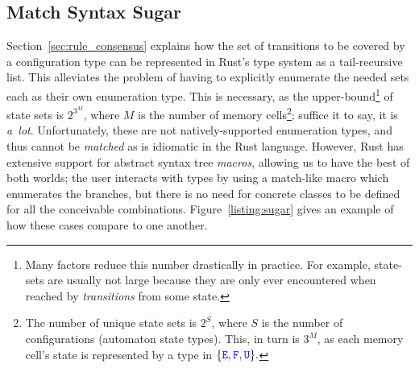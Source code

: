 %
%
%	
%	


\subsection{Match Syntax Sugar}
Section~\ref{sec:rule_consensus} explains how the set of transitions to be covered by a configuration type can be represented in Rust's type system as a tail-recursive list. This alleviates the problem of having to explicitly enumerate the needed sets each as their own enumeration type. This is necessary, as the upper-bound\footnote{Many factors reduce this number drastically in practice. For example, state-sets are usually not large because they are only ever encountered when reached by \textit{transitions} from some state.} of state sets is $2^{3^M}$, where $M$ is the number of memory cells\footnote{The number of unique state sets is $2^S$, where $S$ is the number of configurations (automaton state types). This, in turn is $3^M$, as each memory cell's state is represented by a type in $\{\text{\textcolor{blue}{\texttt{E}}}, \text{\textcolor{blue}{\texttt{F}}}, \text{\textcolor{blue}{\texttt{U}}}\}.$}; suffice it to say, it is \textit{a~lot}.
Unfortunately, these are not natively-supported enumeration types, and thus cannot be \textit{matched} as is idiomatic in the Rust language. However, Rust has extensive support for abstract syntax tree \textit{macros}, allowing us to have the best of both worlds; the user interacts with  types by using a match-like macro which enumerates the branches, but there is no need for concrete  classes to be defined for all the conceivable combinations. Figure~\ref{listing:sugar} gives an example of how these cases compare to one another.


